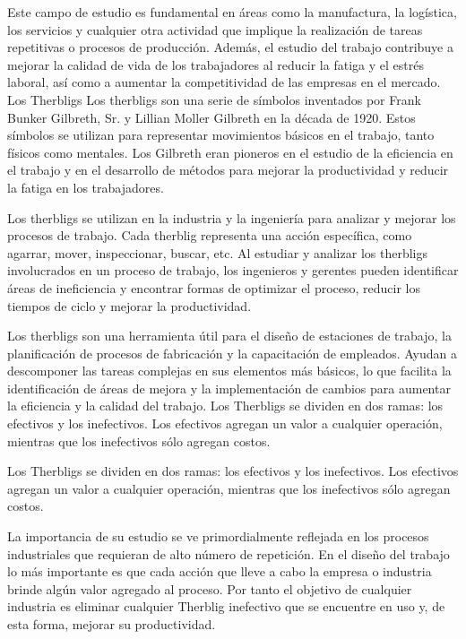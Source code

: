 \documentclass[letterpaper,12pt,openright,oneside]{article}
\theoremstyle{plain}
\begin{document}
Este campo de estudio es fundamental en áreas como la manufactura, la logística, los servicios y cualquier otra actividad que implique la realización de tareas repetitivas o procesos de producción. Además, el estudio del trabajo contribuye a mejorar la calidad de vida de los trabajadores al reducir la fatiga y el estrés laboral, así como a aumentar la competitividad de las empresas en el mercado.
Los Therbligs
Los therbligs son una serie de símbolos inventados por Frank Bunker Gilbreth, Sr. y Lillian Moller Gilbreth en la década de 1920. Estos símbolos se utilizan para representar movimientos básicos en el trabajo, tanto físicos como mentales. Los Gilbreth eran pioneros en el estudio de la eficiencia en el trabajo y en el desarrollo de métodos para mejorar la productividad y reducir la fatiga en los trabajadores.


Los therbligs se utilizan en la industria y la ingeniería para analizar y mejorar los procesos de trabajo. Cada therblig representa una acción específica, como agarrar, mover, inspeccionar, buscar, etc. Al estudiar y analizar los therbligs involucrados en un proceso de trabajo, los ingenieros y gerentes pueden identificar áreas de ineficiencia y encontrar formas de optimizar el proceso, reducir los tiempos de ciclo y mejorar la productividad.

Los therbligs son una herramienta útil para el diseño de estaciones de trabajo, la planificación de procesos de fabricación y la capacitación de empleados. Ayudan a descomponer las tareas complejas en sus elementos más básicos, lo que facilita la identificación de áreas de mejora y la implementación de cambios para aumentar la eficiencia y la calidad del trabajo.
Los Therbligs se dividen en dos ramas: los efectivos y los inefectivos. Los efectivos agregan un valor a cualquier operación, mientras que los inefectivos sólo agregan costos.

Los Therbligs se dividen en dos ramas: los efectivos y los inefectivos. Los efectivos agregan un valor a cualquier operación, mientras que los inefectivos sólo agregan costos.

La importancia de su estudio se ve primordialmente reflejada en los procesos industriales que requieran de alto número de repetición. En el diseño del trabajo lo más importante es que cada acción que lleve a cabo la empresa o industria brinde algún valor agregado al proceso. Por tanto el objetivo de cualquier industria es eliminar cualquier Therblig inefectivo que se encuentre en uso y, de esta forma, mejorar su productividad.
\end{document}
